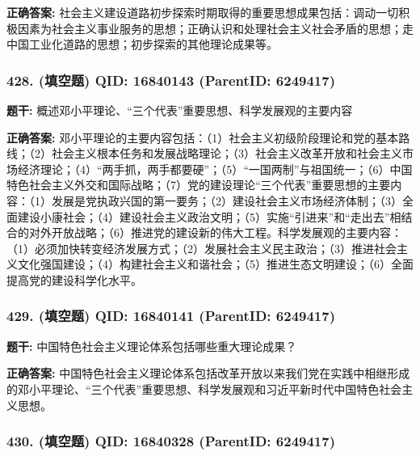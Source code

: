 \documentclass[12pt,UTF8]{ctexart}
\begin{document}
\textbf{正确答案:}
社会主义建设道路初步探索时期取得的重要思想成果包括：调动一切积极因素为社会主义事业服务的思想；正确认识和处理社会主义社会矛盾的思想；走中国工业化道路的思想；初步探索的其他理论成果等。

\vspace{0.3em}\hrulefill\vspace{0.7em}

\subsubsection*{428. (填空题) \small QID: 16840143 (ParentID: 6249417)}

\textbf{题干:}
概述邓小平理论、“三个代表”重要思想、科学发展观的主要内容



\textbf{正确答案:}
邓小平理论的主要内容包括：（1）社会主义初级阶段理论和党的基本路线；（2）社会主义根本任务和发展战略理论；（3）社会主义改革开放和社会主义市场经济理论；（4）“两手抓，两手都要硬”；（5）“一国两制”与祖国统一；（6）中国特色社会主义外交和国际战略；（7）党的建设理论“三个代表”重要思想的主要内容：（1）发展是党执政兴国的第一要务；（2）建设社会主义市场经济体制；（3）全面建设小康社会；（4）建设社会主义政治文明；（5）实施“引进来”和“走出去”相结合的对外开放战略；（6）推进党的建设新的伟大工程。科学发展观的主要内容：（1）必须加快转变经济发展方式；（2）发展社会主义民主政治；（3）推进社会主义文化强国建设；（4）构建社会主义和谐社会；（5）推进生态文明建设；（6）全面提高党的建设科学化水平。

\vspace{0.3em}\hrulefill\vspace{0.7em}

\subsubsection*{429. (填空题) \small QID: 16840141 (ParentID: 6249417)}

\textbf{题干:}
中国特色社会主义理论体系包括哪些重大理论成果？



\textbf{正确答案:}
中国特色社会主义理论体系包括改革开放以来我们党在实践中相继形成的邓小平理论、“三个代表”重要思想、科学发展观和习近平新时代中国特色社会主义思想。

\vspace{0.3em}\hrulefill\vspace{0.7em}

\subsubsection*{430. (填空题) \small QID: 16840328 (ParentID: 6249417)}
\end{document}
